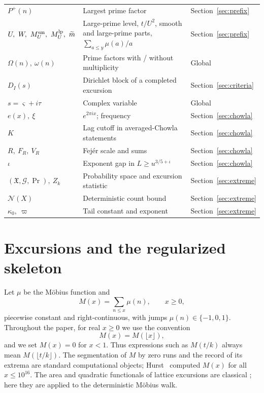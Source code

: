 \documentclass[11pt]{amsart}
\numberwithin{equation}{section}
\theoremstyle{plain}
\theoremstyle{definition}
\theoremstyle{remark}
\newcommand{\Pp}{P^{+}}
\newcommand{\mt}{\widetilde{m}}
\begin{document}
\begin{longtable}{@{}p{}p{}p{}@{}}
$\Pp(n)$ & Largest prime factor & Section~\ref{sec:prefix}\\
$U,\ W,\ M^{\rm sm}_U,\ M^{\rm lp}_U,\ \mt$ & Large-prime level, $t/U^2$, smooth and large-prime parts, $\sum_{a\le y}\mu(a)/a$ & Section~\ref{sec:prefix}\\
$\Omega(n),\ \omega(n)$ & Prime factors with / without multiplicity & Global\\
$D_I(s)$ & Dirichlet block of a completed excursion & Section~\ref{sec:criteria}\\
$s=\varsigma+i\tau$ & Complex variable & Global\\
$e(x),\ \xi$ & $e^{2\pi ix}$; frequency & Section~\ref{sec:chowla}\\
$K$ & Lag cutoff in averaged-Chowla statements & Section~\ref{sec:chowla}\\
$R,\ F_R,\ V_R$ & Fejér scale and sums & Section~\ref{sec:chowla}\\
$\iota$ & Exponent gap in $L\ge u^{3/5+\iota}$ & Section~\ref{sec:chowla}\\
$(\mathfrak X,\mathcal G,\Pr),\ Z_k$ & Probability space and excursion statistic & Section~\ref{sec:extreme}\\
$\mathcal N(X)$ & Deterministic count bound & Section~\ref{sec:extreme}\\
$\kappa_0,\ \varpi$ & Tail constant and exponent & Section~\ref{sec:extreme}\\
\bottomrule
\end{longtable}
\normalsize

\section{Excursions and the regularized skeleton}
\label{sec:definitions}

Let $\mu$ be the M\"obius function and
\begin{equation}
\label{eq:mertens_def}
M(x)=\sum_{n\le x}\mu(n),\qquad x\ge0,
\end{equation}
piecewise constant and right-continuous, with jumps $\mu(n)\in\{-1,0,1\}$.
Throughout the paper, for real $x\ge0$ we use the convention
\[
M(x)=M(\lfloor x\rfloor),
\]
and we set $M(x)=0$ for $x<1$. Thus expressions such as $M(t/k)$ always
mean $M(\lfloor t/k\rfloor)$. The segmentation of $M$ by zero runs and the record of its
extrema are standard computational objects; Hurst~\cite{Hurst18} computed
$M(x)$ for all $x\le10^{16}$. The area and quadratic functionals of lattice
excursions are classical
\cite{Takacs91,NguyenThe04,Richard05,Janson07,DKW15,CP17}; here they are
applied to the deterministic M\"obius walk.
\end{document}
